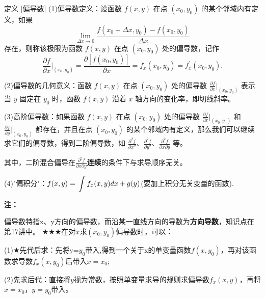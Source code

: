 \documentclass[a4paper,12pt,oneside,fontset=none]{ctexbook}
\let\oldlim\lim
\renewcommand{\lim}{\displaystyle\oldlim}
\let\oldint\int
\renewcommand{\int}{\displaystyle{\vrule width 0pt height 0em depth 0em}\oldint}
\newcounter{definition}[chapter]
\newenvironment{definition}[1][]{\begin{defBox}{定义}{#1}}{\end{defBox}}
\newenvironment{note}{
    \par\vspace{0.5em}\noindent
    \textbf{\color{NoteColor} 注：}
}{
    \par\vspace{0.5em}
}
\numberwithin{equation}{chapter}
\begin{document}
\begin{definition}
    [偏导数]
    (1)偏导数定义：设函数 $f(x,y)$ 在点 $(x_0,y_0)$ 的某个邻域内有定义，如果 $$\lim_{\Delta x  \to 0} \frac{f(x_0+\Delta x,y_0) - f(x_0,y_0)}{\Delta x}$$存在，则称该极限为函数 $f(x,y)$ 在点 $(x_0,y_0)$ 处的偏导数，记作 
    $$\frac{\partial f}{\partial x}|_{(x_0,y_0)} = \frac{\partial [f(x_0,y_0)]}{\partial x} = f_x(x_0,y_0) = f_x^{'}(x_0,y_0).$$
    
    (2)偏导数的几何意义：函数 $f(x,y)$ 在点 $(x_0,y_0)$ 处的偏导数 $\frac{\partial f}{\partial x}|_{(x_0,y_0)}$ 表示当 $y$ 固定在 $y_0$ 时，函数 $f(x,y)$ 沿着 $x$ 轴方向的变化率，即切线斜率。
    
    (3)高阶偏导数：如果函数 $f(x,y)$ 在点 $(x_0,y_0)$ 处的偏导数 $\frac{\partial f}{\partial x}|_{(x_0,y_0)}$ 和 $\frac{\partial f}{\partial y}|_{(x_0,y_0)}$ 都存在，并且在点 $(x_0,y_0)$ 的某个邻域内有定义，那么我们可以继续求它们的偏导数，得到二阶偏导数，如 $\frac{\partial^2 f}{\partial x^2}$、$\frac{\partial^2 f}{\partial y^2}$、$\frac{\partial^2 f}{\partial x \partial y}$ 等。

    其中，二阶混合偏导在$\frac{\partial^2 f}{\partial x \partial y}$\textbf{连续}的条件下与求导顺序无关。

    (4)"偏积分"：$f(x,y) = \int f_x(x,y) dx + g(y)$(要加上积分无关变量的函数).
\end{definition}
\begin{note}
    偏导数特指x、y方向的偏导数，而沿某一直线方向的导数为\textbf{方向导数}，知识点在第17讲中。
    $\bigstar\bigstar\bigstar$在对$x$求$(x_0,y_0)$偏导数时，可以：

    (1)$\bigstar$先代后求：先将y=$y_0$带入,得到一个关于x的单变量函数$f(x,y_0)$，再对该函数求导数$f_x(x,y_0)$后带入$x=x_0$;

    (2)先求后代：直接将$y$视为常数，按照单变量求导的规则求偏导数$f_x(x,y)$，再将$x=x_0$，$y=y_0$带入。
\end{note}
\end{document}
